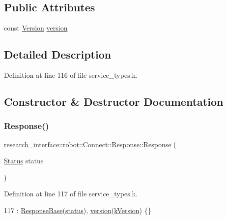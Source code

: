\subsection*{Public Attributes}
\begin{DoxyCompactItemize}
\item 
const \hyperlink{namespaceresearch__interface_1_1robot_aa7a53d2c58ee4f7aa706b905ddcc7d47}{Version} \hyperlink{structresearch__interface_1_1robot_1_1Connect_1_1Response_abe8d2a59496e8f98eddc6a4a5aeb7936}{version}
\end{DoxyCompactItemize}


\subsection{Detailed Description}


Definition at line 116 of file service\+\_\+types.\+h.



\subsection{Constructor \& Destructor Documentation}
\mbox{\label{structresearch__interface_1_1robot_1_1Connect_1_1Response_a35f6044fae8722636842ca463ca108e5}} 
\subsubsection{\texorpdfstring{Response()}{Response()}}
{\footnotesize\ttfamily research\+\_\+interface\+::robot\+::\+Connect\+::\+Response\+::\+Response (\begin{DoxyParamCaption}\item[{\hyperlink{structresearch__interface_1_1robot_1_1Connect_acd25a9893ac3b26eeb1eb776173c7e69}{Status}}]{status }\end{DoxyParamCaption})\hspace{0.3cm}{\ttfamily [inline]}}



Definition at line 117 of file service\+\_\+types.\+h.


\begin{DoxyCode}
117 : \hyperlink{structresearch__interface_1_1robot_1_1ResponseBase_a10b3259c2dfd5ed4c4297e5993245fff}{ResponseBase}(\hyperlink{structresearch__interface_1_1robot_1_1ResponseBase_a99bb821172a0ac77338cd8e0acbe8a96}{status}), \hyperlink{structresearch__interface_1_1robot_1_1Connect_1_1Response_abe8d2a59496e8f98eddc6a4a5aeb7936}{version}(\hyperlink{namespaceresearch__interface_1_1robot_ab5e6cd0268270dc6e0adea0eb333b5df}{kVersion}) \{\}
\end{DoxyCode}



